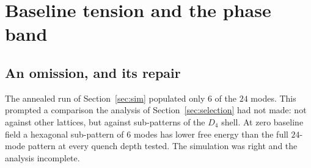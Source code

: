 \documentclass[a4paper,11pt]{article}
\numberwithin{equation}{section}
\theoremstyle{jsplain}
\theoremstyle{jsrem}
\begin{document}
\section{Baseline tension and the phase band}\label{sec:band}

\subsection{An omission, and its repair}

The annealed run of Section~\ref{sec:sim} populated only $6$ of the $24$ modes. This prompted a comparison the analysis of Section~\ref{sec:selection} had not made: not against other lattices, but against sub-patterns of the $D_4$ shell. At zero baseline field a hexagonal sub-pattern of $6$ modes has lower free energy than the full $24$-mode pattern at every quench depth tested. The simulation was right and the analysis incomplete.
\end{document}
